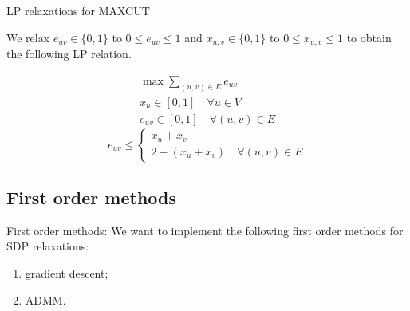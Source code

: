 \documentclass[10pt]{beamer}
\begin{document}
        \begin{frame}{LP relaxations for MAXCUT}
        
        We relax $e_{uv} \in \{0, 1\}$ to $0 \le e_{uv} \le 1$ and $x_{u,v} \in \{0, 1\}$ to $0 \le x_{u,v} \le 1$ to obtain the following LP relation.
            
            \begin{align*}
                \max \sum\limits_{(u,v) \in E} e_{uv} \\
                x_u \in [0,1] \quad \forall u \in V\\
                e_{uv} \in [0,1] \quad \forall (u,v) \in E
            \end{align*}
            \begin{equation*}
                e_{uv} \le 
                \begin{cases}
                    x_u + x_v \\
                    2 - (x_u + x_v) \quad \forall (u,v) \in E
                \end{cases}
            \end{equation*}
            
        \end{frame}   
        
    \subsection{First order methods}
        \begin{frame}{First order methods:}
            We want to implement the following first order methods for SDP relaxations:
            \begin{enumerate}
                \item gradient descent;
                \item ADMM.
            \end{enumerate}
            
        \end{frame}
        
\end{document}
